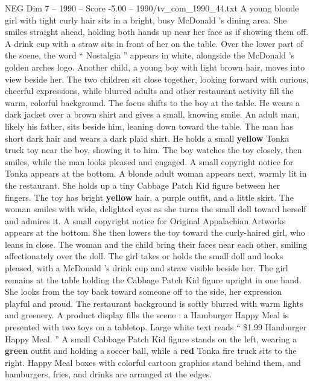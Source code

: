 \begin{textsample}{NEG Dim 7 – 1990 – Score -5.00 – 1990/tv\_com\_1990\_44.txt}  \label{ex:f7_neg_031}
A young blonde girl with tight curly hair sits in a bright, busy McDonald ’s dining area.
She smiles straight ahead, holding both hands up near her face as if showing them off.
A drink cup with a straw sits in front of her on the table.
Over the lower part of the scene, the word “ Nostalgia ” appears in white, alongside the McDonald ’s golden arches logo.
Another child, a young boy with light brown hair, moves into view beside her.
The two children sit close together, looking forward with curious, cheerful expressions, while blurred adults and other restaurant activity fill the warm, colorful background.
The focus shifts to the boy at the table.
He wears a dark jacket over a brown shirt and gives a small, knowing smile.
An adult man, likely his father, sits beside him, leaning down toward the table.
The man has short dark hair and wears a dark plaid shirt.
He holds a small \textbf{yellow} Tonka truck toy near the boy, showing it to him.
The boy watches the toy closely, then smiles, while the man looks pleased and engaged.
A small copyright notice for Tonka appears at the bottom.
A blonde adult woman appears next, warmly lit in the restaurant.
She holds up a tiny Cabbage Patch Kid figure between her fingers.
The toy has bright \textbf{yellow} hair, a purple outfit, and a little skirt.
The woman smiles with wide, delighted eyes as she turns the small doll toward herself and admires it.
A small copyright notice for Original Appalachian Artworks appears at the bottom.
She then lowers the toy toward the curly-haired girl, who leans in close.
The woman and the child bring their faces near each other, smiling affectionately over the doll.
The girl takes or holds the small doll and looks pleased, with a McDonald ’s drink cup and straw visible beside her.
The girl remains at the table holding the Cabbage Patch Kid figure upright in one hand.
She looks from the toy back toward someone off to the side, her expression playful and proud.
The restaurant background is softly blurred with warm lights and greenery.
A product display fills the scene : a Hamburger Happy Meal is presented with two toys on a tabletop.
Large white text reads “ \$1.99 Hamburger Happy Meal. ” A small Cabbage Patch Kid figure stands on the left, wearing a \textbf{green} outfit and holding a soccer ball, while a \textbf{red} Tonka fire truck sits to the right.
Happy Meal boxes with colorful cartoon graphics stand behind them, and hamburgers, fries, and drinks are arranged at the edges.

\end{textsample}
